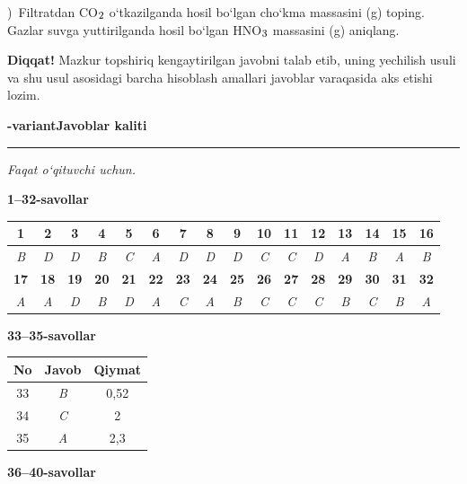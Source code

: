 \documentclass[11pt,a4paper]{article}
\renewcommand{\textsubscript}[1]{\ensuremath{_{\text{\fontsize{8}{8}\selectfont #1}}}}
\newcommand{\qsep}{\par\vspace{13pt}}
\newcommand{\diqqat}[1]{\par\smallskip\noindent\textbf{Diqqat!} #1\par\medskip}
\begin{document}
)\ Filtratdan CO\textsubscript{2} o`tkazilganda hosil bo`lgan cho`kma massasini (g) toping. Gazlar suvga yuttirilganda hosil bo`lgan HNO\textsubscript{3} massasini (g) aniqlang.\par
\diqqat{Mazkur topshiriq kengaytirilgan javobni talab etib, uning yechilish usuli va shu usul asosidagi barcha hisoblash amallari javoblar varaqasida aks etishi lozim.}\qsep
\newpage
\noindent\textbf{\fontsize{13}{15}-variant}\hfill \textbf{Javoblar kaliti}\par\smallskip\hrule\smallskip
\textit{Faqat o`qituvchi uchun.}\par\medskip
\noindent\textbf{1--32-savollar}\par\smallskip
\noindent\begin{tabular}{|c|c|c|c|c|c|c|c|c|c|c|c|c|c|c|c|}\hline
\textbf{1} & \textbf{2} & \textbf{3} & \textbf{4} & \textbf{5} & \textbf{6} & \textbf{7} & \textbf{8} & \textbf{9} & \textbf{10} & \textbf{11} & \textbf{12} & \textbf{13} & \textbf{14} & \textbf{15} & \textbf{16}\\\hline
\textsl{B} & \textsl{D} & \textsl{D} & \textsl{B} & \textsl{C} & \textsl{A} & \textsl{D} & \textsl{D} & \textsl{D} & \textsl{C} & \textsl{C} & \textsl{D} & \textsl{A} & \textsl{B} & \textsl{A} & \textsl{B}\\\hline
\textbf{17} & \textbf{18} & \textbf{19} & \textbf{20} & \textbf{21} & \textbf{22} & \textbf{23} & \textbf{24} & \textbf{25} & \textbf{26} & \textbf{27} & \textbf{28} & \textbf{29} & \textbf{30} & \textbf{31} & \textbf{32}\\\hline
\textsl{A} & \textsl{A} & \textsl{D} & \textsl{B} & \textsl{D} & \textsl{A} & \textsl{C} & \textsl{A} & \textsl{B} & \textsl{C} & \textsl{C} & \textsl{C} & \textsl{B} & \textsl{C} & \textsl{B} & \textsl{A}\\\hline
\end{tabular}\par\medskip
\noindent\textbf{33--35-savollar}\par\smallskip
\noindent\begin{tabular}{|c|c|c|}\hline \textbf{No} & \textbf{Javob} & \textbf{Qiymat}\\\hline
33 & \textsl{B} & 0,52\\\hline
34 & \textsl{C} & 2\\\hline
35 & \textsl{A} & 2,3\\\hline
\end{tabular}\par\medskip
\noindent\textbf{36--40-savollar}\par\smallskip
\end{document}
